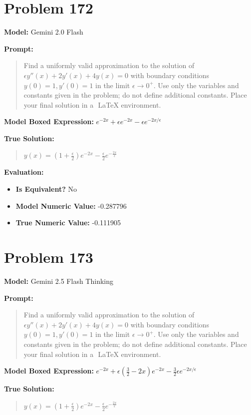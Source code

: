 \documentclass{article}
\begin{document}
{\section*{Problem 172}
\textbf{Model:} Gemini 2.0 Flash

\textbf{Prompt:}
\begin{quote}
Find a uniformly valid approximation to the solution of $\epsilon y''(x) + 2y' (x)+ 4y(x) = 0$ with boundary conditions $y(0) = 1, y'(0) = 1$ in the limit $\epsilon \to 0^+$. Use only the variables and constants given in the problem; do not define additional constants. Place your final solution in a $\boxed{}$ LaTeX environment.
\end{quote}
\textbf{Model Boxed Expression:} $e^{-2x} + \epsilon e^{-2x} - \epsilon e^{-2x/\epsilon}$

\textbf{True Solution:}
\begin{quote}
$y(x) = (1 + \frac{\epsilon}{2})e^{-2x} - \frac{\epsilon}{2} e^{-\frac{2x}{\epsilon}}$
\end{quote}

\textbf{Evaluation:}
\begin{itemize}
\item \textbf{Is Equivalent?} No
\item \textbf{Model Numeric Value:} -0.287796
\item \textbf{True Numeric Value:} -0.111905
\end{itemize}
\vspace{1cm}
\section*{Problem 173}
\textbf{Model:} Gemini 2.5 Flash Thinking

\textbf{Prompt:}
\begin{quote}
Find a uniformly valid approximation to the solution of $\epsilon y''(x) + 2y' (x)+ 4y(x) = 0$ with boundary conditions $y(0) = 1, y'(0) = 1$ in the limit $\epsilon \to 0^+$. Use only the variables and constants given in the problem; do not define additional constants. Place your final solution in a $\boxed{}$ LaTeX environment.
\end{quote}
\textbf{Model Boxed Expression:} $e^{-2x} + \epsilon\left(\frac{3}{2}-2x\right)e^{-2x} - \frac{3}{2}\epsilon e^{-2x/\epsilon}$

\textbf{True Solution:}
\begin{quote}
$y(x) = (1 + \frac{\epsilon}{2})e^{-2x} - \frac{\epsilon}{2} e^{-\frac{2x}{\epsilon}}$
\end{quote}

}
\end{document}
